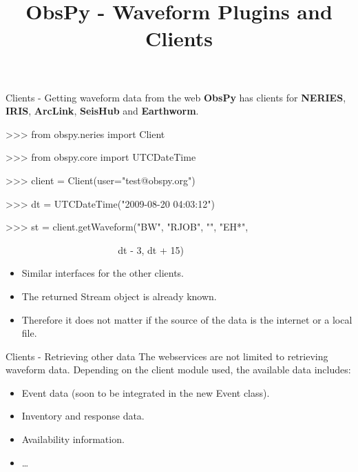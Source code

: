 
\title{ObsPy - Waveform Plugins and Clients}



\frame[plain]{\titlepage}



\begin{frame}[plain]{Clients - Getting waveform data from the web}
    \textbf{ObsPy} has clients for \textbf{NERIES}, \textbf{IRIS}, \textbf{ArcLink}, \textbf{SeisHub} and \textbf{Earthworm}.

\begin{myColorBox}{0.95}{}
\begin{semiverbatim}
>>> from obspy.neries import Client

>>> from obspy.core import UTCDateTime

>>> client = Client(user="test@obspy.org")

>>> dt = UTCDateTime("2009-08-20 04:03:12")

>>> st = client.getWaveform("BW", "RJOB", "", "EH*", \

~ ~ ~ ~ ~ ~ ~ ~ ~ ~ ~ ~ ~ ~ dt - 3, dt + 15)
\end{semiverbatim}
\end{myColorBox}
\begin{itemize}
    \item Similar interfaces for the other clients.
    \item The returned Stream object is already known.
    \item Therefore it does not matter if the source of the data is the internet or a local file.
\end{itemize}
\end{frame}


\begin{frame}[plain]{Clients - Retrieving other data}
    The webservices are not limited to retrieving waveform data. Depending on the client module used, the available data includes:
    \vspace{2em}
    \begin{itemize}
        \item Event data (soon to be integrated in the new Event class).
        \item Inventory and response data.
        \item Availability information.
        \item \dots
    \end{itemize}
\end{frame}


